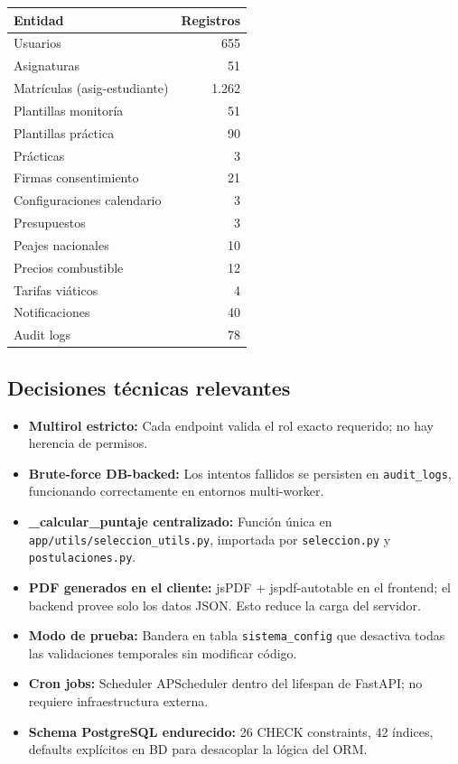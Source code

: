 \documentclass[12pt,a4paper]{article}
\begin{document}
\begin{center}
\begin{tabular}{lr}
  \toprule
  \textbf{Entidad} & \textbf{Registros} \\
  \midrule
  Usuarios                    & 655 \\
  Asignaturas                 & 51 \\
  Matrículas (asig-estudiante) & 1.262 \\
  Plantillas monitoría        & 51 \\
  Plantillas práctica         & 90 \\
  Prácticas                   & 3 \\
  Firmas consentimiento       & 21 \\
  Configuraciones calendario  & 3 \\
  Presupuestos                & 3 \\
  Peajes nacionales           & 10 \\
  Precios combustible         & 12 \\
  Tarifas viáticos            & 4 \\
  Notificaciones              & 40 \\
  Audit logs                  & 78 \\
  \bottomrule
\end{tabular}
\end{center}

\subsection{Decisiones técnicas relevantes}

\begin{itemize}[leftmargin=1.5cm]
  \item \textbf{Multirol estricto:} Cada endpoint valida el rol exacto requerido; no hay herencia de permisos.
  \item \textbf{Brute-force DB-backed:} Los intentos fallidos se persisten en \texttt{audit\_logs}, funcionando correctamente en entornos multi-worker.
  \item \textbf{\_calcular\_puntaje centralizado:} Función única en \texttt{app/utils/seleccion\_utils.py}, importada por \texttt{seleccion.py} y \texttt{postulaciones.py}.
  \item \textbf{PDF generados en el cliente:} jsPDF + jspdf-autotable en el frontend; el backend provee solo los datos JSON. Esto reduce la carga del servidor.
  \item \textbf{Modo de prueba:} Bandera en tabla \texttt{sistema\_config} que desactiva todas las validaciones temporales sin modificar código.
  \item \textbf{Cron jobs:} Scheduler APScheduler dentro del lifespan de FastAPI; no requiere infraestructura externa.
  \item \textbf{Schema PostgreSQL endurecido:} 26 CHECK constraints, 42 índices, defaults explícitos en BD para desacoplar la lógica del ORM.
\end{itemize}
\end{document}
